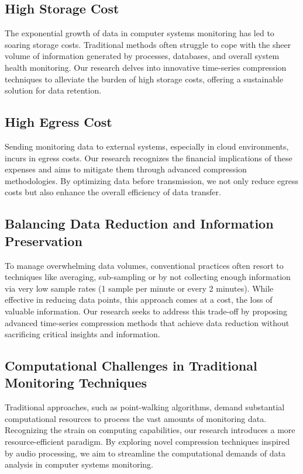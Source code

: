 \documentclass[conference]{IEEEtran}
\begin{document}
\subsection{High Storage Cost}

The exponential growth of data in computer systems monitoring has led to soaring storage costs. Traditional methods often struggle to cope with the sheer volume of information generated by processes, databases, and overall system health monitoring. Our research delves into innovative time-series compression techniques to alleviate the burden of high storage costs, offering a sustainable solution for data retention. 

\subsection{High Egress Cost}
Sending monitoring data to external systems, especially in cloud environments, incurs in egress costs. Our research recognizes the financial implications of these expenses and aims to mitigate them through advanced compression methodologies. By optimizing data before transmission, we not only reduce egress costs but also enhance the overall efficiency of data transfer. 

\subsection{Balancing Data Reduction and Information Preservation}
To manage overwhelming data volumes, conventional practices often resort to techniques like averaging, sub-sampling or by not collecting enough information via very low sample rates (1 sample per minute or every 2 minutes). While effective in reducing data points, this approach comes at a cost, the loss of valuable information. Our research seeks to address this trade-off by proposing advanced time-series compression methods that achieve data reduction without sacrificing critical insights and information. 

\subsection{Computational Challenges in Traditional Monitoring Techniques}
Traditional approaches, such as point-walking algorithms, demand substantial computational resources to process the vast amounts of monitoring data. Recognizing the strain on computing capabilities, our research introduces a more resource-efficient paradigm. By exploring novel compression techniques inspired by audio processing, we aim to streamline the computational demands of data analysis in computer systems monitoring. 
\end{document}
